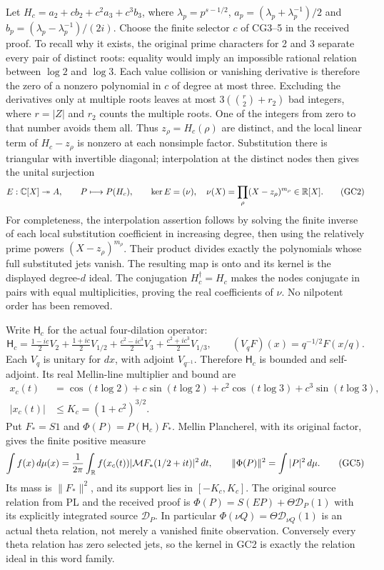 Let $H_c=a_2+c b_2+c^2a_3+c^3b_3$, where
$\lambda_p=p^{s-1/2}$, $a_p=(\lambda_p+\lambda_p^{-1})/2$ and
$b_p=(\lambda_p-\lambda_p^{-1})/(2i)$. Choose the finite selector
$c$ of CG3--5 in the received proof. To recall why it exists,
the original prime characters for 2 and 3 separate every pair of
distinct roots: equality would imply an impossible rational
relation between $\log2$ and $\log3$. Each value collision or
vanishing derivative is therefore the zero of a nonzero polynomial
in $c$ of degree at most three. Excluding the derivatives only at
multiple roots leaves at most $3(\binom r2+r_2)$ bad integers,
where $r=|Z|$ and $r_2$ counts the multiple roots. One of the
integers from zero to that number avoids them all.
Thus $z_\rho=H_c(\rho)$ are distinct, and the local linear term
of $H_c-z_\rho$ is nonzero at each nonsimple factor. Substitution
there is triangular with invertible diagonal; interpolation at
the distinct nodes then gives the unital surjection
\[
 E:\mathbb C[X]\twoheadrightarrow A,\qquad P\longmapsto P(H_c),
 \qquad \ker E=(\nu),\quad
 \nu(X)=\prod_\rho(X-z_\rho)^{m_\rho}\in\mathbb R[X].
 \tag{GC2}\label{gc:observation}
\]
For completeness, the interpolation assertion follows by solving
the finite inverse of each local substitution coefficient in
increasing degree, then using the relatively prime powers
$(X-z_\rho)^{m_\rho}$. Their product divides exactly the
polynomials whose full substituted jets vanish. The resulting
map is onto and its kernel is the displayed degree-$d$ ideal.
The conjugation $H_c^\dagger=H_c$ makes the nodes conjugate in
pairs with equal multiplicities, proving the real coefficients
of $\nu$. No nilpotent order has been removed.

Write $\mathsf H_c$ for the actual four-dilation operator:
\[
 \mathsf H_c=\tfrac{1-ic}{2}V_2+\tfrac{1+ic}{2}V_{1/2}
       +\tfrac{c^2-ic^3}{2}V_3+\tfrac{c^2+ic^3}{2}V_{1/3},
 \qquad (V_qF)(x)=q^{-1/2}F(x/q).
 \tag{GC3}\label{gc:operator}
\]
Each $V_q$ is unitary for $dx$, with adjoint $V_{q^{-1}}$.
Therefore $\mathsf H_c$ is bounded and self-adjoint. Its real
Mellin-line multiplier and bound are
\[
 \begin{aligned}
 x_c(t)&=\cos(t\log2)+c\sin(t\log2)
                +c^2\cos(t\log3)+c^3\sin(t\log3),\\
 |x_c(t)|&\le K_c=(1+c^2)^{3/2}.
 \end{aligned}
 \tag{GC4}\label{gc:symbol}
\]
Put $F_*=S1$ and $\Phi(P)=P(\mathsf H_c)F_*$. Mellin
Plancherel, with its original factor, gives the finite positive
measure
\[
 \int f(x)\,d\mu(x)=\frac1{2\pi}\int_\mathbb R
       f(x_c(t))|\mathcal MF_*(1/2+it)|^2\,dt,
 \qquad \|\Phi(P)\|^2=\int|P|^2\,d\mu.
 \tag{GC5}\label{gc:measure}
\]
Its mass is $\|F_*\|^2$, and its support lies in $[-K_c,K_c]$.
The original source relation from PL and the received proof is
$\Phi(P)=S(EP)+\Theta\mathcal D_P(1)$ with its explicitly
integrated source $\mathcal D_P$. In particular
$\Phi(\nu Q)=\Theta\mathcal D_{\nu Q}(1)$ is an actual theta
relation, not merely a vanished finite observation. Conversely
every theta relation has zero selected jets, so the kernel in
GC2 is exactly the relation ideal in this word family.

